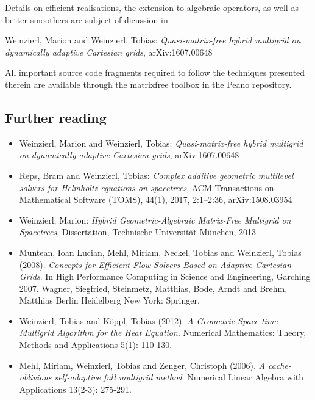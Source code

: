 Details on efficient realisations, the extension to algebraic operators,
as well as better smoothers are subject of dicussion in 

 \begin{framed} 
 \noindent
Weinzierl, Marion and Weinzierl, Tobias: {\em Quasi-matrix-free hybrid multigrid
on dynamically adaptive Cartesian grids}, arXiv:1607.00648
 \end{framed}
  
\noindent
All important source code fragments required to follow the techniques presented
therein are available through the matrixfree toolbox in the Peano repository.



\subsection*{Further reading}

\begin{itemize}
  \item Weinzierl, Marion and Weinzierl, Tobias: {\em Quasi-matrix-free hybrid
  multigrid on dynamically adaptive Cartesian grids}, arXiv:1607.00648
  \item  Reps, Bram and Weinzierl, Tobias: {\em Complex additive geometric
  multilevel solvers for Helmholtz equations on spacetrees}, ACM Transactions on
  Mathematical Software (TOMS), 44(1), 2017, 2:1--2:36, arXiv:1508.03954
  \item Weinzierl, Marion: {\em Hybrid Geometric-Algebraic Matrix-Free Multigrid on
Spacetrees}, Dissertation, Technische Universit\"at M\"unchen, 2013
  \item   Muntean, Ioan Lucian, Mehl, Miriam, Neckel, Tobias and Weinzierl,
  Tobias (2008). {\em Concepts for Efficient Flow Solvers Based on Adaptive
  Cartesian Grids}. In High Performance Computing in Science and Engineering,
  Garching 2007. Wagner, Siegfried, Steinmetz, Matthias, Bode, Arndt and Brehm,
  Matthias Berlin Heidelberg New York: Springer.
  \item Weinzierl, Tobias and K\"oppl, Tobias (2012). {\em A Geometric
  Space-time Multigrid Algorithm for the Heat Equation}. Numerical Mathematics:
  Theory, Methods and Applications 5(1): 110-130.
  \item Mehl, Miriam, Weinzierl, Tobias and Zenger, Christoph (2006). {\em A
  cache-oblivious self-adaptive full multigrid method}. Numerical Linear Algebra
  with Applications 13(2-3): 275-291.
\end{itemize}
